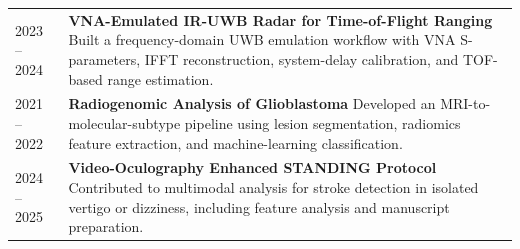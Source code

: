 
\begin{table}[!h]
\small
\begin{tabular}{R{4cm}!{\color{gray}\vrule}p{11.5cm}}
2023 -- 2024 &
  \textbf{VNA-Emulated IR-UWB Radar for Time-of-Flight Ranging} \newline
  Built a frequency-domain UWB emulation workflow with VNA S-parameters, IFFT
  reconstruction, system-delay calibration, and TOF-based range estimation.
  \vspace{3pt} \\
2021 -- 2022 &
  \textbf{Radiogenomic Analysis of Glioblastoma} \newline
  Developed an MRI-to-molecular-subtype pipeline using lesion segmentation,
  radiomics feature extraction, and machine-learning classification.
  \vspace{3pt} \\
2024 -- 2025 &
  \textbf{Video-Oculography Enhanced STANDING Protocol} \newline
  Contributed to multimodal analysis for stroke detection in isolated vertigo
  or dizziness, including feature analysis and manuscript preparation. \\
\end{tabular}
\end{table}
